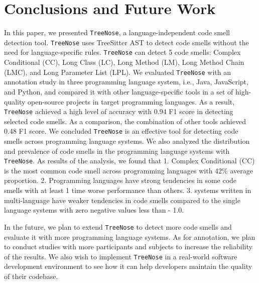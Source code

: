 \section{Conclusions and Future Work}

In this paper, we presented \texttt{TreeNose}, a language-independent code
smell detection tool. \texttt{TreeNose} uses TreeSitter AST to detect code
smells without the need for language-specific rules. \texttt{TreeNose} can
detect 5 code smells: Complex Conditional (CC), Long Class (LC), Long Method
(LM), Long Method Chain (LMC), and Long Parameter List (LPL). We evaluated
\texttt{TreeNose} with an annotation study in three programming language
system, i.e., Java, JavaScript, and Python, and compared it with other
language-specific tools in a set of high-quality open-source projects in target
programming languages. As a result, \texttt{TreeNose} achieved a high level of
accuracy with 0.94 F1 score in detecting selected code smells. As a comparison,
the combination of other tools achieved 0.48 F1 score. We concluded
\texttt{TreeNose} is an effective tool for detecting code smells across
programming language systems. We also analyzed the distribution and prevalence
of code smells in the programming language systems with \texttt{TreeNose}. As
results of the analysis, we found that 1. Complex Conditional (CC) is the most
common code smell across programming languages with 42\% average proportion. 2.
Programming languages have strong tendencies in some code smells with at least
1 time worse performance than others. 3. systems written in multi-language have
weaker tendencies in code smells compared to the single language systems with
zero negative values less than - 1.0.

In the future, we plan to extend \texttt{TreeNose} to detect more code smells
and evaluate it with more programming language systems. As for annotation, we
plan to conduct studies with more participants and subjects to increase the
reliability of the results. We also wish to implement \texttt{TreeNose} in a
real-world software development environment to see how it can help developers
maintain the quality of their codebase.
